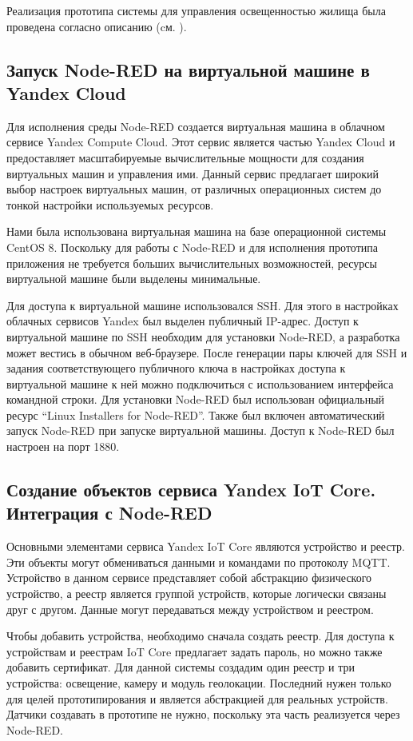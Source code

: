 Реализация прототипа системы для управления освещенностью
жилища была проведена согласно описанию (cм. ).

\subsection{Запуск Node-RED на виртуальной машине в Yandex Cloud}
Для исполнения среды Node-RED создается виртуальная машина в облачном сервисе Yandex Compute Cloud. Этот сервис является частью Yandex Cloud и предоставляет масштабируемые вычислительные мощности для создания виртуальных машин и управления ими. Данный сервис предлагает широкий выбор настроек виртуальных машин, от различных операционных систем до тонкой настройки используемых ресурсов.

Нами была использована виртуальная машина на базе операционной системы CentOS 8. Поскольку для работы с Node-RED и для исполнения прототипа приложения не требуется больших вычислительных возможностей, ресурсы виртуальной машине были выделены минимальные.

Для доступа к виртуальной машине использовался SSH. Для этого в настройках облачных сервисов Yandex был выделен публичный IP-адрес. Доступ к виртуальной машине по SSH необходим для установки Node-RED, а разработка может вестись в обычном веб-браузере. После генерации пары ключей для SSH и задания соответствующего публичного ключа в настройках доступа к виртуальной машине к ней можно подключиться с использованием интерфейса командной строки. Для установки Node-RED был использован официальный ресурс ``Linux Installers for Node-RED''. Также был включен автоматический запуск Node-RED при запуске виртуальной машины. Доступ к Node-RED был настроен на порт 1880.

\subsection {Создание объектов сервиса Yandex IoT Core. Интеграция с Node-RED}
Основными элементами сервиса Yandex IoT Core являются устройство и реестр. Эти объекты могут обмениваться данными и командами по протоколу MQTT. Устройство в данном сервисе представляет собой абстракцию физического устройство, а реестр является группой устройств, которые логически связаны друг с другом. Данные могут передаваться между устройством и реестром.

Чтобы добавить устройства, необходимо сначала создать реестр. Для доступа к устройствам и реестрам IoT Core предлагает задать пароль, но можно также добавить сертификат. Для данной системы создадим один реестр и три устройства: освещение, камеру и модуль геолокации. Последний нужен только для целей прототипирования и является абстракцией для реальных устройств. Датчики создавать в прототипе не нужно, поскольку эта часть реализуется через Node-RED.

